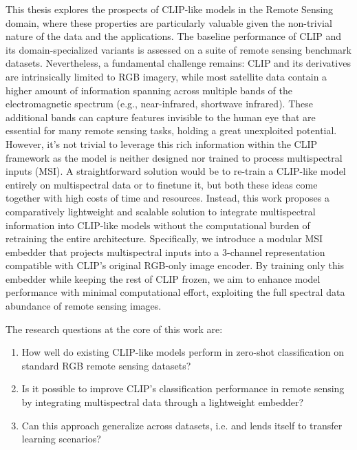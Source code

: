 \documentclass[a4paper, oneside, english]{sapthesis} %
\begin{document}
This thesis explores the prospects of CLIP-like models in the Remote Sensing domain, where these properties are particularly valuable given the non-trivial nature of the data and the applications. The baseline performance of CLIP and its domain-specialized variants \cite{liu2024remoteclip} \cite{zhang2024rs5m} \cite{wang2024skyscript} is assessed on a suite of remote sensing benchmark datasets. Nevertheless, a fundamental challenge remains: CLIP and its derivatives are intrinsically limited to RGB imagery, while most satellite data contain a higher amount of information spanning across multiple bands of the electromagnetic spectrum (e.g., near-infrared, shortwave infrared). These additional bands can capture features invisible to the human eye that are essential for many remote sensing tasks, holding a great unexploited potential. However, it's not trivial to leverage this rich information within the CLIP framework as the model is neither designed nor trained to process multispectral inputs (MSI). A straightforward solution would be to re-train a CLIP-like model entirely on multispectral data \cite{marimo2025beyond} or to finetune it, but both these ideas come together with high costs of time and resources. Instead, this work proposes a comparatively lightweight and scalable solution to integrate multispectral information into CLIP-like models without the computational burden of retraining the entire architecture. Specifically, we introduce a modular MSI embedder that projects multispectral inputs into a 3-channel representation compatible with CLIP's original RGB-only image encoder. By training only this embedder while keeping the rest of CLIP frozen, we aim to enhance model performance with minimal computational effort, exploiting the full spectral data abundance of remote sensing images.

The research questions at the core of this work are:

\begin{enumerate}
    \item How well do existing CLIP-like models perform in zero-shot classification on standard RGB remote sensing datasets?
    \item Is it possible to improve CLIP’s classification performance in remote sensing by integrating multispectral data through a lightweight embedder?
    \item Can this approach generalize across datasets, i.e. and lends itself to transfer learning scenarios?
\end{enumerate}
\end{document}
